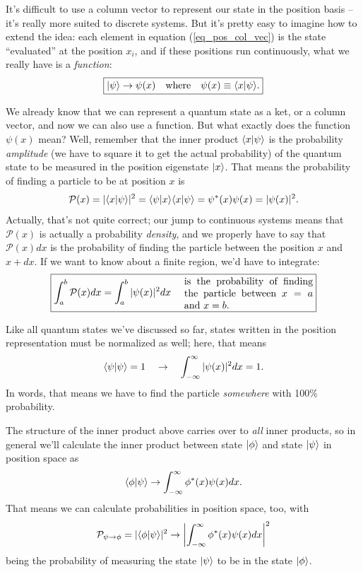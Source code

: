 It's difficult to use a column vector to represent our state in the position basis -- it's really more suited to discrete systems.  But it's pretty easy to imagine how to extend the idea: each element in equation (\ref{eq_pos_col_vec}) is the state ``evaluated'' at the position $x_i$, and if these positions run continuously, what we really have is a \emph{function}:
\begin{equation}
\label{eq_wave_function_defined}
\boxed{
| \psi \rangle \to  \psi(x) \quad \text{where} \quad \psi(x) \equiv \langle x | \psi \rangle.
}
\end{equation}

We already know that we can represent a quantum state as a ket, or a column vector, and now we can also use a function.  But what exactly does the function $\psi(x)$ mean?  Well, remember that the inner product $\langle x | \psi \rangle$ is the probability \emph{amplitude} (we have to square it to get the actual probability) of the quantum state to be measured in the position eigenstate $| x \rangle$.  That means the probability of finding a particle to be at position $x$ is
\[
\mathcal{P}(x) = | \langle x | \psi \rangle|^2 = \langle \psi | x \rangle\langle x | \psi \rangle = \psi^*(x)\psi(x) = |\psi(x)|^2.
\]
Actually, that's not quite correct; our jump to continuous systems means that $\mathcal{P}(x)$ is actually a probability \emph{density}, and we properly have to say that $\mathcal{P}(x)dx$ is the probability of finding the particle between the position $x$ and $x + dx$.  If we want to know about a finite region, we'd have to integrate:
\begin{equation}
\boxed{
\int_a^b \mathcal{P}(x) dx = \int_a^b |\psi(x)|^2 dx \quad  \text{ \parbox[l]{1.8in}{is the probability of finding the particle between $x = a$ and $x=b$.}} 
}
\end{equation}

Like all quantum states we've discussed so far, states written in the position representation must be normalized as well; here, that means
\begin{equation}
\label{eq_space_norm}
\langle \psi | \psi \rangle = 1 \quad \to \quad \int_{-\infty}^\infty |\psi(x)|^2 dx = 1. 
\end{equation}
In words, that means we have to find the particle \emph{somewhere} with 100\% probability.

The structure of the inner product above carries over to \emph{all} inner products, so in general we'll calculate the inner product between state $| \phi \rangle$ and state $| \psi \rangle$ in position space as
\begin{equation}
\langle \phi | \psi \rangle \to \int_{-\infty}^\infty \phi^*(x) \psi(x) dx. 
\end{equation}
That means we can calculate probabilities in position space, too, with
\begin{equation}
\mathcal{P}_{\psi \to \phi} = |\langle \phi | \psi \rangle|^2 \to \left| \int_{-\infty}^\infty \phi^*(x) \psi(x) dx \right|^2
\end{equation}
being the probability of measuring the state $| \psi \rangle$ to be in the state $| \phi \rangle$.


